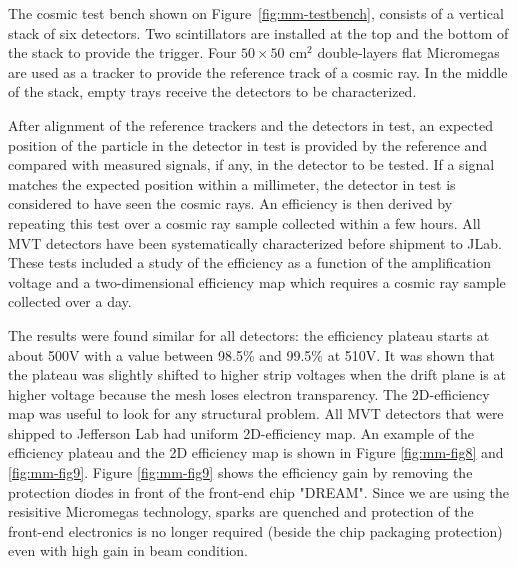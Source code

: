 The cosmic test bench shown on Figure~\ref{fig:mm-testbench}, consists of a vertical stack of six detectors. Two scintillators are installed 
at the top and the bottom of the stack to provide the trigger. Four $50 \times 50 \text{ cm}^2$ double-layers flat 
Micromegas are used as a tracker to provide the reference track of a cosmic ray. In the middle of the stack, empty 
trays receive the detectors to be characterized.

After alignment of the reference trackers and the detectors in test, an expected position of the particle in the detector in test is provided by the reference and compared with measured signals, if any, in the detector to be tested. If a signal matches the expected position within a millimeter, the detector in test is considered to have seen the cosmic rays. An efficiency is then derived by repeating this test over a cosmic ray sample collected within a few hours. All MVT detectors have been systematically characterized before shipment to JLab. These tests included a study of the efficiency as a 
function of the amplification voltage and a two-dimensional efficiency map which requires a cosmic ray sample collected over a day.

The results were found similar for all detectors: the efficiency plateau starts at about 500V with a value between 98.5\% and 
99.5\% at 510V. It was shown that the plateau was slightly shifted to higher strip voltages when the drift plane is at 
higher voltage because the mesh loses electron transparency. The 2D-efficiency map was useful to look for any 
structural problem. All MVT detectors that were shipped to Jefferson Lab had uniform 2D-efficiency map. An example of 
the efficiency plateau and the 2D efficiency map is shown in Figure \ref{fig:mm-fig8} and \ref{fig:mm-fig9}. Figure \ref{fig:mm-fig9} shows the efficiency gain by removing the protection diodes in front of the front-end chip "DREAM". Since we are using the resisitive Micromegas technology, sparks are quenched and protection of the front-end electronics is no longer required (beside the chip packaging protection) even with high gain in beam condition.

